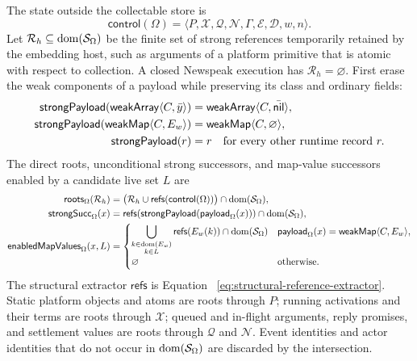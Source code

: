 The state outside the collectable store is
\begin{equation}\label{eq:gc-control-state}
 \mathsf{control}(\Omega)=
 \langle P,\mathcal X,\mathcal Q,\mathcal N,
          \Gamma,\mathcal E,\mathcal D,w,n\rangle.
\end{equation}
Let $\mathcal R_h\subseteq\mathop{\mathrm{dom}}(\mathcal S_\Omega)$ be the finite set of strong
references temporarily retained by the embedding host, such as arguments of a
platform primitive that is atomic with respect to collection.  A closed
Newspeak execution has $\mathcal R_h=\varnothing$.  First erase the weak
components of a payload while preserving its class and ordinary fields:
\begin{equation}\label{eq:gc-strong-payload}
\begin{aligned}
 \mathsf{strongPayload}(\mathsf{weakArray}\langle C,\bar y\rangle)
   &=\mathsf{weakArray}\langle C,\bar{\mathsf{nil}}\rangle,\\
 \mathsf{strongPayload}(\mathsf{weakMap}\langle C,E_w\rangle)
   &=\mathsf{weakMap}\langle C,\varnothing\rangle,\\
 \mathsf{strongPayload}(r)&=r
   \quad\text{for every other runtime record }r.
\end{aligned}
\end{equation}
The direct roots, unconditional strong successors, and map-value successors
enabled by a candidate live set $L$ are
\begin{equation}\label{eq:gc-roots-and-successors}
\begin{aligned}
 \mathsf{roots}_{\Omega}(\mathcal R_h)
   &=\bigl(\mathcal R_h\cup
       \mathsf{refs}(\mathsf{control}(\Omega))\bigr)
       \cap\mathop{\mathrm{dom}}(\mathcal S_\Omega),\\
 \mathsf{strongSucc}_{\Omega}(x)
   &=\mathsf{refs}(\mathsf{strongPayload}(
        \mathsf{payload}_{\Omega}(x)))
       \cap\mathop{\mathrm{dom}}(\mathcal S_\Omega),\\
 \mathsf{enabledMapValues}_{\Omega}(x,L)
   &=\begin{cases}
      \displaystyle
      \bigcup_{\substack{k\in\mathop{\mathrm{dom}}(E_w)\\ k\in L}}
        \mathsf{refs}(E_w(k))\cap\mathop{\mathrm{dom}}(\mathcal S_\Omega)
       & \mathsf{payload}_{\Omega}(x)=
           \mathsf{weakMap}\langle C,E_w\rangle,\\[3mm]
      \varnothing & \text{otherwise.}
     \end{cases}
\end{aligned}
\end{equation}
The structural extractor $\mathsf{refs}$ is Equation~
\eqref{eq:structural-reference-extractor}.  Static platform objects and atoms
are roots through $P$; running activations and their terms are roots through
$\mathcal X$; queued and in-flight arguments, reply promises, and settlement
values are roots through $\mathcal Q$ and $\mathcal N$.  Event identities and
actor identities that do not occur in $\mathop{\mathrm{dom}}(\mathcal S_\Omega)$ are discarded
by the intersection.

